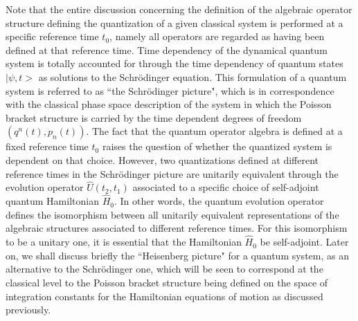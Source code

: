 \documentclass[a4paper,11pt]{article}
\begin{document}
Note that the entire discussion concerning the definition of
the algebraic operator structure defining the quantization of
a given classical system is performed at a specific reference
time $t_0$, namely all operators are regarded as having been
defined at that reference time. Time dependency of the dynamical
quantum system is totally accounted for through the time dependency
of quantum states $|\psi,t>$ as solutions to the Schr\"odinger equation.
This formulation of a quantum system is referred to as ``the Schr\"odinger
picture", which is in correspondence with the classical phase space
description of the system in which the Poisson bracket structure is
carried by the time dependent degrees of freedom $(q^n(t),p_n(t))$.
The fact that the quantum operator algebra is defined at a fixed reference
time $t_0$ raises the question of whether the quantized system is
dependent on that choice. However, two quantizations defined at different
reference times in the Schr\"odinger picture
are unitarily equivalent through the evolution operator
$\hat{U}(t_2,t_1)$ associated to a specific choice of self-adjoint
quantum Hamiltonian $\hat{H}_0$. In other words, the quantum evolution
operator defines the isomorphism between all unitarily equivalent
representations of the algebraic structures associated to different
reference times. For this isomorphism to be a unitary one, it is
essential that the Hamiltonian $\hat{H}_0$ be self-adjoint.
Later on, we shall discuss briefly the ``Heisenberg picture" for
a quantum system, as an alternative to the Schr\"odinger one,
which will be seen to correspond at the classical level to the
Poisson bracket structure being defined on the space of integration
constants for the Hamiltonian equations of motion as discussed previously.
\end{document}
